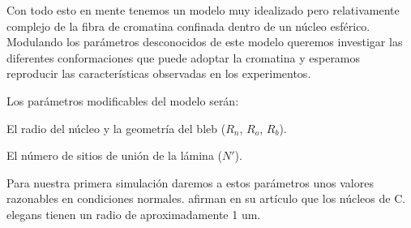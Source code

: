 Con todo esto en mente tenemos un modelo muy idealizado pero relativamente complejo de la fibra de cromatina confinada dentro de un núcleo esférico. Modulando los parámetros desconocidos de este modelo queremos investigar las diferentes conformaciones que puede adoptar la cromatina y esperamos reproducir las características observadas en los experimentos.

Los parámetros modificables del modelo serán:

El radio del núcleo y la geometría del bleb ($R_n$, $R_o$, $R_b$).

El número de sitios de unión de la lámina ($N'$).

Para nuestra primera simulación daremos a estos parámetros unos valores razonables en condiciones normales. \cite{Ikegami2010} afirman en su artículo que los núcleos de C. elegans tienen un radio de aproximadamente 1 $\text{um}$.
